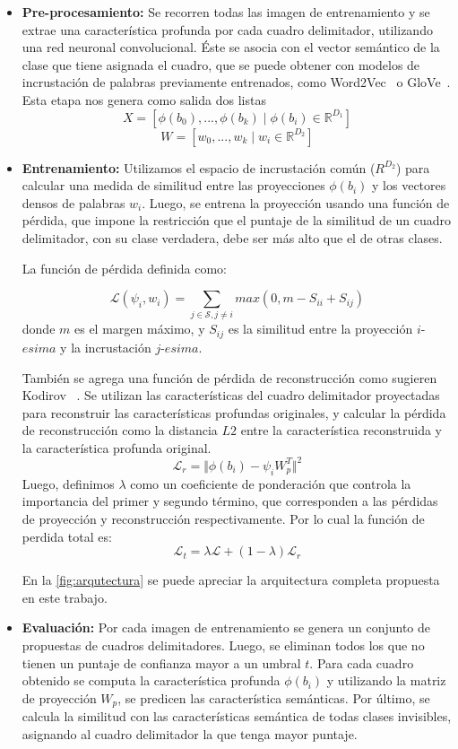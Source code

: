 \begin{itemize}
	\item \textbf{Pre-procesamiento:} Se recorren todas las imagen de entrenamiento y se extrae una característica profunda por cada cuadro delimitador, utilizando una red neuronal convolucional. Éste se asocia con el vector semántico de la clase que tiene asignada el cuadro, que se puede obtener con modelos de incrustación de palabras previamente entrenados, como Word2Vec~\cite{mikolov2013distributed} o GloVe~\cite{pennington2014glove}. Esta etapa nos genera como salida dos listas 
	\[X = [\phi(b_0),...,\phi(b_k) \mid \phi(b_i) \in \mathbb{R}^{D_1}]\] 
	\[W = [w_0,...,w_k \mid w_i \in \mathbb{R}^{D_2}]\]
	
	\item \textbf{Entrenamiento:} Utilizamos el espacio de incrustación común (${R}^{D_2}$) para calcular una medida de similitud entre las proyecciones  $\phi(b_i)$ y los vectores densos de palabras $w_i$. Luego, se entrena la proyección usando una función de pérdida, que impone la restricción que el puntaje de la similitud de un cuadro delimitador, con su clase verdadera, debe ser más alto que el de otras clases. 

	La función de pérdida definida como: 
	
	\[\mathcal{L}(\psi_i, w_i) = \sum_{j \in \mathcal{S}, j\neq i} max(0, m - S_{ii} + S_{ij})\] 
	donde $m$ es el margen máximo, y $S_{ij}$ es la similitud entre la proyección $i$-$esima$ y la incrustación $j$-$esima$.
 
	También se agrega una función de pérdida de reconstrucción como sugieren Kodirov \etal~\cite{kodirov2017semantic}. Se utilizan las características del cuadro delimitador proyectadas para reconstruir las características profundas originales, y calcular la pérdida de reconstrucción como la distancia $L2$  entre la característica reconstruida y la característica profunda original.
	\[\mathcal{L}_r = \Vert{\phi(b_i) - \psi_iW_p^T}\Vert^2 \] 
	Luego, definimos $\lambda$ como un coeficiente de ponderación que controla la importancia del primer y segundo término, que corresponden a las pérdidas de proyección y reconstrucción respectivamente. Por lo cual la función de perdida total es: 
	\[\mathcal{L}_t = \lambda \mathcal{L} + (1-\lambda) \mathcal{L}_r \]
 	 
 	En la \autoref{fig:arqutectura} se puede apreciar la arquitectura completa propuesta en este trabajo.
 	 
 	\item \textbf{Evaluación:} Por cada imagen de entrenamiento se genera un conjunto de propuestas de cuadros delimitadores. Luego, se eliminan todos los que no tienen un puntaje de confianza mayor a un umbral $t$. Para cada cuadro obtenido se computa la característica profunda $\phi(b_i)$ y utilizando la matriz de proyección $W_p$, se predicen las característica semánticas. Por último, se calcula la similitud con las características semántica de todas clases invisibles, asignando al cuadro delimitador la que tenga mayor puntaje.
\end{itemize}


